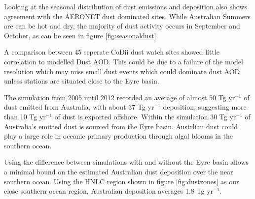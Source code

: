 
Looking at the seasonal distribution of dust emissions and deposition also shows agreement with the AERONET dust dominated sites.
While Australian Summers are can be hot and dry, the majority of dust activity occurs in September and October, as can be seen in figure \ref{fig:seasonaldust}

A comparison between 45 seperate CoDii dust watch sites showed little correlation to modelled Dust AOD.
This could be due to a failure of the model resolution which may miss small dust events which could dominate dust AOD unless stations are situated close to the Eyre basin.

The simulation from 2005 until 2012 recorded an average of almost 50 Tg yr$^{-1}$ of dust emitted from Australia, with about 37 Tg yr$^{-1}$ deposition, suggesting more than 10 Tg yr$^{-1}$ of dust is exported offshore.
Within the simulation 30 Tg yr$^{-1}$ of Australia's emitted dust is sourced from the Eyre basin.
Austrlian dust could play a large role in oceanic primary production through algal blooms in the southern ocean.

Using the difference between simulations with and without the Eyre basin allows a minimal bound on the estimated Australian dust deposition over the near southern ocean.
Using the HNLC region shown in figure \ref{fig:dustzones} as our close southern ocean region, Australian deposition averages 1.8 Tg yr$^{-1}$.